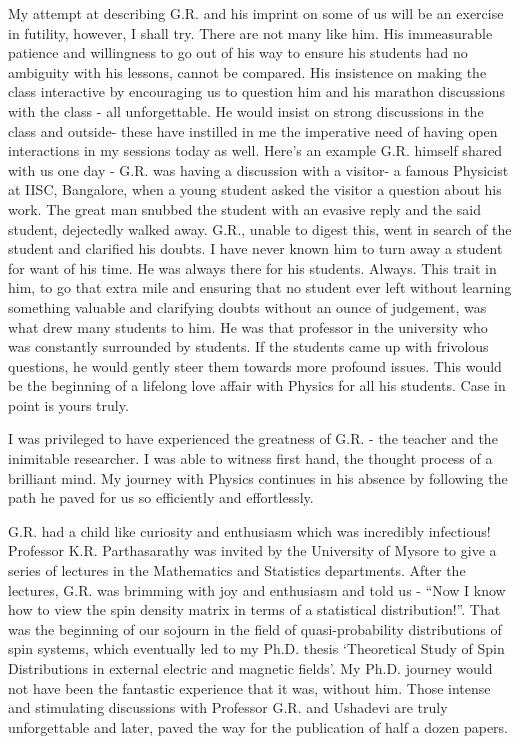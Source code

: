 My attempt at describing G.R. and his imprint on some of us will be an exercise in
futility, however, I shall try. There are not many like him. His immeasurable patience
and willingness to go out of his way to ensure his students had no ambiguity with his
lessons, cannot be compared. His insistence on making the class interactive by encouraging us to question him and his marathon discussions with the class - all unforgettable.
He would insist on strong discussions in the class and outside- these have instilled in
me the imperative need of having open interactions in my sessions today as well. Here’s
an example G.R. himself shared with us one day - G.R. was having a discussion with a
visitor- a famous Physicist at IISC, Bangalore, when a young student asked the visitor a
question about his work. The great man snubbed the student with an evasive reply and
the said student, dejectedly walked away. G.R., unable to digest this, went in search of
the student and clarified his doubts. I have never known him to turn away a student
for want of his time. He was always there for his students. Always. This trait in him,
to go that extra mile and ensuring that no student ever left without learning something
valuable and clarifying doubts without an ounce of judgement, was what drew many
students to him. He was that professor in the university who was constantly surrounded
by students. If the students came up with frivolous questions, he would gently steer
them towards more profound issues. This would be the beginning of a lifelong love affair
with Physics for all his students. Case in point is yours truly.


I was privileged to have experienced the greatness of G.R. - the teacher and the inimitable researcher. 
I was able to witness first hand, the thought process of a brilliant
mind. My journey with Physics continues in his absence by following the path he paved
for us so efficiently and effortlessly.

G.R. had a child like curiosity and enthusiasm which was incredibly infectious! Professor 
K.R. Parthasarathy was invited by the University of Mysore to give a series of
lectures in the Mathematics and Statistics departments. After the lectures, G.R. was
brimming with joy and enthusiasm and told us - “Now I know how to view the spin
density matrix in terms of a statistical distribution!”. That was the beginning of our
sojourn in the field of quasi-probability distributions of spin systems, which eventually
led to my Ph.D. thesis `Theoretical Study of Spin Distributions in external electric and
magnetic fields'. My Ph.D. journey would not have been the fantastic experience that it
was, without him. Those intense and stimulating discussions with Professor G.R. and
Ushadevi are truly unforgettable and later, paved the way for the publication of half a
dozen papers.

